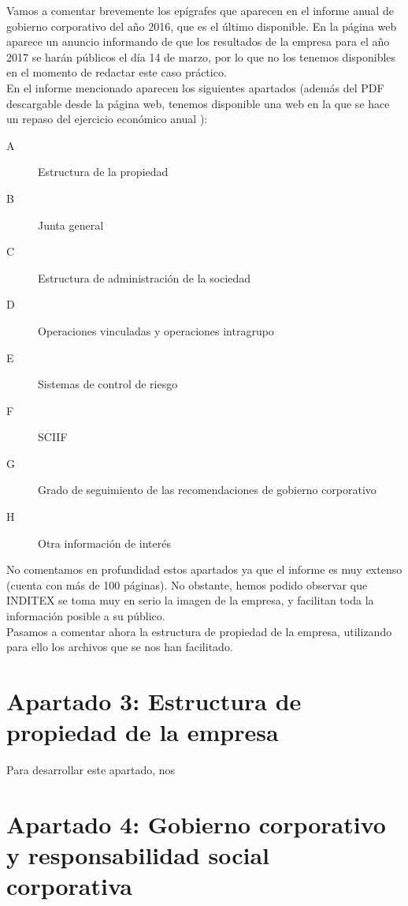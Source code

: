 \documentclass[11pt]{article}
\theoremstyle{plain}
\theoremstyle{definition}
\begin{document}
Vamos a comentar brevemente los epígrafes que aparecen en el informe
anual de gobierno corporativo del año 2016, que es el último
disponible.  En la página web aparece un anuncio informando de que los
resultados de la empresa para el año 2017 se harán públicos el día 14
de marzo, por lo que no los tenemos disponibles en el momento de
redactar este
caso práctico.\\

En el informe mencionado aparecen los siguientes apartados (además del
PDF descargable desde la página web, tenemos disponible una web en la
que se hace un repaso del ejercicio económico anual
\cite{annual-report}):

\begin{description}
\item[A] Estructura de la propiedad
\item[B] Junta general
\item[C] Estructura de administración de la sociedad
\item[D] Operaciones vinculadas y operaciones intragrupo
\item[E] Sistemas de control de riesgo
\item[F] SCIIF
\item[G] Grado de seguimiento de las recomendaciones de gobierno
  corporativo
\item[H] Otra información de interés
\end{description}

No comentamos en profundidad estos apartados ya que el informe es muy
extenso (cuenta con más de 100 páginas). No obstante, hemos podido
observar que INDITEX se toma muy en serio la imagen de la empresa,
y facilitan toda la información posible a su público.\\

Pasamos a comentar ahora la estructura de propiedad de la empresa,
utilizando para ello los archivos que se nos han facilitado.

\section*{Apartado 3: Estructura de propiedad de la empresa}

Para desarrollar este apartado, nos 

\section*{Apartado 4: Gobierno corporativo y responsabilidad social
  corporativa}

\printbibliography
\end{document}
